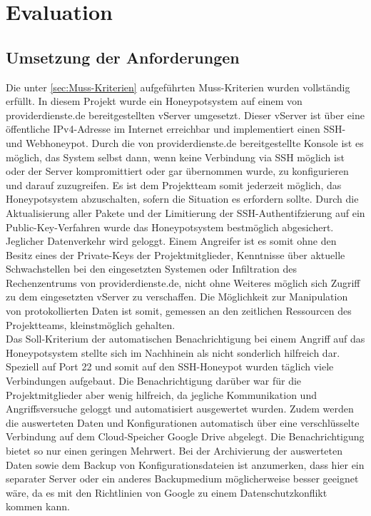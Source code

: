 \chapter{Evaluation}
\label{ch:Evaluation}

\section{Umsetzung der Anforderungen}
\label{sec:Umsetzung der Anforderungen}

Die unter \ref{sec:Muss-Kriterien} aufgeführten Muss-Kriterien wurden vollständig erfüllt. In diesem Projekt wurde ein Honeypotsystem auf einem von providerdienste.de bereitgestellten vServer umgesetzt. Dieser vServer ist über eine öffentliche IPv4-Adresse im Internet erreichbar und implementiert einen SSH- und Webhoneypot. Durch die von providerdienste.de bereitgestellte Konsole ist es möglich, das System selbst dann, wenn keine Verbindung via SSH möglich ist oder der Server kompromittiert oder gar übernommen wurde, zu konfigurieren und darauf zuzugreifen. Es ist dem Projektteam somit jederzeit möglich, das Honeypotsystem abzuschalten, sofern die Situation es erfordern sollte. Durch die Aktualisierung aller Pakete und der Limitierung der SSH-Authentifzierung auf ein Public-Key-Verfahren wurde das Honeypotsystem bestmöglich abgesichert. Jeglicher Datenverkehr wird geloggt. Einem Angreifer ist es somit ohne den Besitz eines der Private-Keys der Projektmitglieder, Kenntnisse über aktuelle Schwachstellen bei den eingesetzten Systemen oder Infiltration des Rechenzentrums von providerdienste.de, nicht ohne Weiteres möglich sich Zugriff zu dem eingesetzten vServer zu verschaffen. Die Möglichkeit zur Manipulation von protokollierten Daten ist somit, gemessen an den zeitlichen Ressourcen des Projektteams, kleinstmöglich gehalten.\\

Das Soll-Kriterium der automatischen Benachrichtigung bei einem Angriff auf das Honeypotsystem stellte sich im Nachhinein als nicht sonderlich hilfreich dar. Speziell auf Port 22 und somit auf den SSH-Honeypot wurden täglich viele Verbindungen aufgebaut. Die Benachrichtigung darüber war für die Projektmitglieder aber wenig hilfreich, da jegliche Kommunikation und Angriffsversuche geloggt und automatisiert ausgewertet wurden. Zudem werden die auswerteten Daten und Konfigurationen automatisch über eine verschlüsselte Verbindung auf dem Cloud-Speicher Google Drive abgelegt. Die Benachrichtigung bietet so nur einen geringen Mehrwert. Bei der Archivierung der auswerteten Daten sowie dem Backup von Konfigurationsdateien ist anzumerken, dass hier ein separater Server oder ein anderes Backupmedium möglicherweise besser geeignet wäre, da es mit den Richtlinien von Google zu einem Datenschutzkonflikt kommen kann.\\


